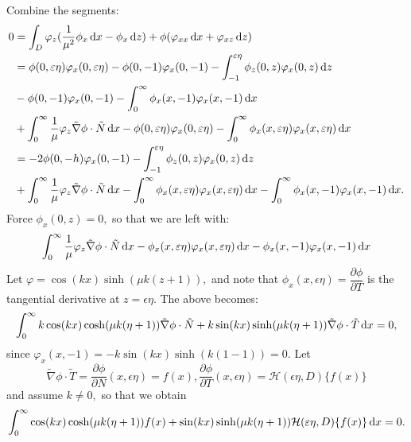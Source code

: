 \documentclass[10pt,reqno,oneside,a4paper]{article}
\begin{document}
Combine the segments:
\begin{align*}
0 &= \int_D \varphi_z(\frac{1}{\mu^2} \phi_x \,\mathrm{d} x - \phi_x \,\mathrm{d} z) + \phi(\varphi_{xx} \,\mathrm{d} x + \varphi_{xz} \,\mathrm{d} z) \\
&= \phi(0, \varepsilon \eta) \varphi_x(0, \varepsilon\eta) - \phi(0, -1) \varphi_x(0, -1) - \int_{-1}^{\varepsilon\eta} \phi_{z}(0,z) \varphi_{x}(0,z) \,\mathrm{d} z  \\
&- \phi(0,-1) \varphi_{x}(0,-1) - \int^{\infty}_{0} \phi_x(x,-1) \varphi_x(x,-1) \,\mathrm{d} x \\
&+\int_{0}^{\infty} \frac{1}{\mu} \varphi_z \tilde{\nabla} \phi \cdot \tilde{N} \,\mathrm{d} x - \phi(0, \varepsilon \eta) \varphi_x(0, \varepsilon\eta) - \int^{\infty}_{0}\phi_x(x, \varepsilon\eta)  \varphi_x(x, \varepsilon \eta) \,\mathrm{d} x\\
&= - 2\phi(0,-h) \varphi_{x}(0,-1) - \int_{-1}^{\varepsilon\eta} \phi_{z}(0,z) \varphi_{x}(0,z) \,\mathrm{d} z \\
& + \int_{0}^{\infty} \frac{1}{\mu} \varphi_z \tilde{\nabla} \phi \cdot \tilde{N} \,\mathrm{d} x - \int^{\infty}_{0}\phi_x(x, \varepsilon\eta) \varphi_x(x, \varepsilon \eta) \,\mathrm{d} x - \int^{\infty}_{0} \phi_x(x,-1) \varphi_x(x,-1) \,\mathrm{d} x.
\end{align*}
Force $\phi_x(0,z) = 0,$ so that we are left with:
\begin{equation}
\int_{0}^{\infty} \frac{1}{\mu} \varphi_z \tilde{\nabla} \phi \cdot \tilde{N} \,\mathrm{d} x - \phi_x(x, \varepsilon\eta)  \varphi_x(x, \varepsilon \eta) \,\mathrm{d} x -  \phi_x(x,-1) \varphi_x(x,-1) \,\mathrm{d} x
\end{equation}
Let $\varphi = \cos(kx) \sinh(\mu k(z+1)),$ and note that $\phi_x(x, \epsilon\eta) = \dfrac{\partial \phi}{\partial T}$ is the tangential derivative at $z = \epsilon\eta.$ The above becomes:
\begin{equation}
\int_{0}^{\infty} k \cos(kx) \cosh(\mu k(\eta+1)) \tilde{\nabla} \phi \cdot \tilde{N} + k \sin(kx) \sinh(\mu k(\eta+1)) \tilde{\nabla} \phi \cdot \tilde{T} \,\mathrm{d} x = 0,
\end{equation}
since $\varphi_x(x,-1) = -k \sin(kx) \sinh(k(1-1)) = 0.$ Let 
\[\tilde{\nabla} \phi \cdot \tilde{T} = \dfrac{\partial \phi}{\partial N}(x, \epsilon\eta) = f(x), \dfrac{\partial \phi}{\partial T}(x, \epsilon\eta) = \mathcal{H}(\epsilon\eta,D)\{ f(x) \} \] 
and assume $k \neq 0,$ so that we obtain
\begin{equation}\label{DimHLRP}
\int_{0}^{\infty} \cos(kx) \cosh(\mu k(\eta+1)) f(x) + \sin(kx) \sinh(\mu k(\eta+1))\mathcal{H}(\varepsilon \eta,D) \{f(x) \} \,\mathrm{d} x = 0.
\end{equation}
\end{document}
